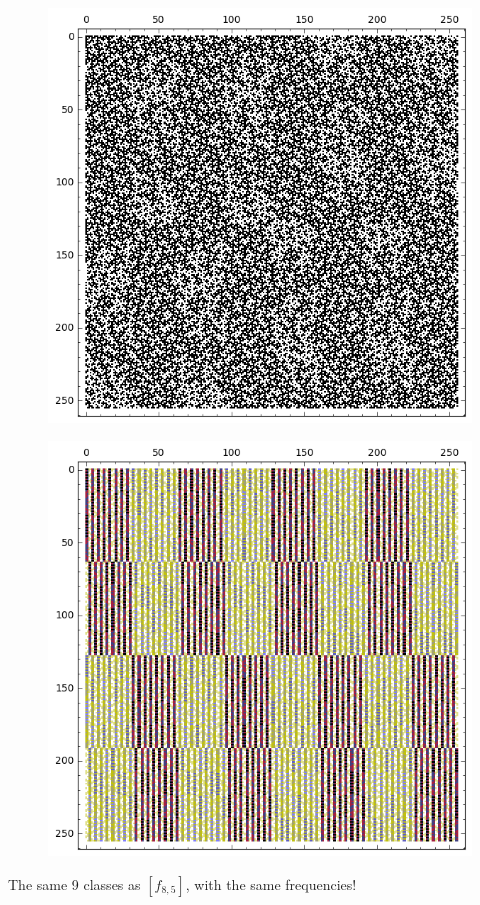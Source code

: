 \documentclass[12pt,a4paper]{article}
\begin{document}
\begin{figure}[!hb]
\centering
\begin{minipage}{.48\textwidth}
  \centering
  \includegraphics[width=.9\linewidth]{../matrix_plot/re8_6_weight_class_matrix.png}
  \label{fig:8_6_weight_class_matrix}
\end{minipage}%
\begin{minipage}{.48\textwidth}
  \centering
  \includegraphics[width=.9\linewidth]{../matrix_plot/re8_6_bent_cayley_graph_index_matrix.png}
  \label{fig:8_6_bent_cayley_graph_index_matrix}
\end{minipage}
\end{figure}
The same 9 classes as $[f_{8,5}]$, with the same frequencies!
\end{document}
